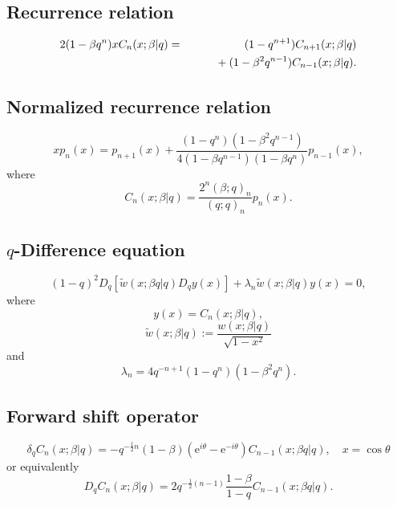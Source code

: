 \documentclass[envcountchap,graybox]{svmono}
\newcommand{\mathindent}{\hspace{7.5mm}}
\newcommand{\e}{\textrm{e}}
\begin{document}
\subsection*{Recurrence relation}
\begin{eqnarray}
\label{RecContqUltra}
2(1-\beta q^n)xC_n(x;\beta|q)&=&(1-q^{n+1})C_{n+1}(x;\beta|q)\nonumber\\
& &{}\mathindent{}+(1-\beta^2 q^{n-1})C_{n-1}(x;\beta|q).
\end{eqnarray}

\subsection*{Normalized recurrence relation}
\begin{equation}
\label{NormRecContqUltra}
xp_n(x)=p_{n+1}(x)+
\frac{(1-q^n)(1-\beta^2q^{n-1})}{4(1-\beta q^{n-1})(1-\beta q^n)}p_{n-1}(x),
\end{equation}
where
$$C_n(x;\beta|q)=\frac{2^n(\beta;q)_n}{(q;q)_n}p_n(x).$$

\subsection*{$q$-Difference equation}
\begin{equation}
\label{dvContqUltra}
(1-q)^2D_q\left[{\tilde w}(x;\beta q|q)D_qy(x)\right]+
\lambda_n{\tilde w}(x;\beta|q)y(x)=0,
\end{equation}
where
$$y(x)=C_n(x;\beta|q),$$
$${\tilde w}(x;\beta|q):=\frac{w(x;\beta|q)}{\sqrt{1-x^2}}$$
and
$$\lambda_n=4q^{-n+1}(1-q^n)(1-\beta^2q^n).$$

\subsection*{Forward shift operator}
\begin{equation}
\label{shift1ContqUltraI}
\delta_qC_n(x;\beta|q)=-q^{-\frac{1}{2}n}(1-\beta)(\e^{i\theta}-\e^{-i\theta})
C_{n-1}(x;\beta q|q),\quad x=\cos\theta
\end{equation}
or equivalently
\begin{equation}
\label{shift1ContqUltraII}
D_qC_n(x;\beta|q)=2q^{-\frac{1}{2}(n-1)}\frac{1-\beta}{1-q}C_{n-1}(x;\beta q|q).
\end{equation}

\newpage
\end{document}
